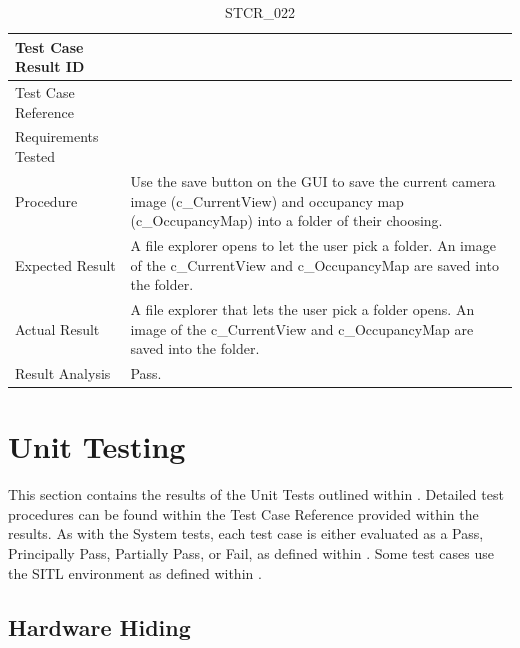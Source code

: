\documentclass[12pt, titlepage]{article}
\begin{document}
\begin{table}[!h]
\begin{center}
\caption {STCR\_022}
\label{tab:STCR_022}
\begin{tabular}{ | m{3.2cm} | m{12.2cm} | } 
\hline
Test Case Result ID & \nameref{tab:STCR_022} \\ 
\hline
Test Case Reference & \nameref{tab:STC_022}  \\ 
\hline
Requirements Tested & \nameref{USE_002} \\
\hline
Procedure & Use the save button on the GUI to save the current camera image (c\_CurrentView) and occupancy map (c\_OccupancyMap) into a folder of their choosing. \\
\hline
Expected Result & A file explorer opens to let the user pick a folder. An image of the c\_CurrentView and c\_OccupancyMap are saved into the folder.  \\ 
\hline
Actual Result &  A file explorer that lets the user pick a folder opens. An image of the c\_CurrentView and c\_OccupancyMap are saved into the folder.  \\
\hline
Result Analysis & Pass. \\ 
\hline
\end{tabular}
\end{center}
\end{table}

\clearpage

\section{Unit Testing}
\label{sec:UnitTesting}

This section contains the results of the Unit Tests outlined within . Detailed test procedures can be found within the Test Case Reference provided within the results. As with the System tests, each test case is either evaluated as a Pass, Principally Pass, Partially Pass, or Fail, as defined within . Some test cases use the SITL environment as defined within .

\subsection{Hardware Hiding}
\label{subsec:hardwareHiding}
\end{document}
